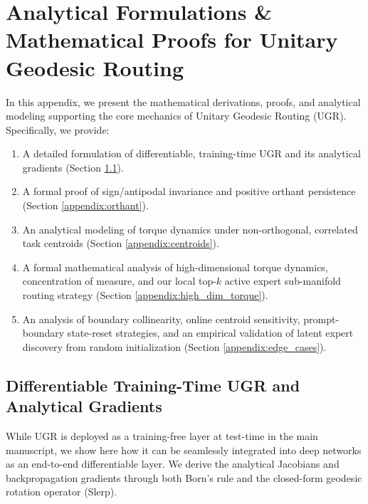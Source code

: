 \documentclass{article}
\theoremstyle{plain}
\theoremstyle{definition}
\theoremstyle{remark}
\begin{document}










\newpage
\appendix
\onecolumn
\section{Analytical Formulations \& Mathematical Proofs for Unitary Geodesic Routing}
\label{appendix:formulations}

In this appendix, we present the mathematical derivations, proofs, and analytical modeling supporting the core mechanics of Unitary Geodesic Routing (UGR). Specifically, we provide:
\begin{enumerate}
    \item A detailed formulation of differentiable, training-time UGR and its analytical gradients (Section \ref{appendix:gradients}).
    \item A formal proof of sign/antipodal invariance and positive orthant persistence (Section \ref{appendix:orthant}).
    \item An analytical modeling of torque dynamics under non-orthogonal, correlated task centroids (Section \ref{appendix:centroids}).
    \item A formal mathematical analysis of high-dimensional torque dynamics, concentration of measure, and our local top-$k$ active expert sub-manifold routing strategy (Section \ref{appendix:high_dim_torque}).
    \item An analysis of boundary collinearity, online centroid sensitivity, prompt-boundary state-reset strategies, and an empirical validation of latent expert discovery from random initialization (Section \ref{appendix:edge_cases}).
\end{enumerate}

\subsection{Differentiable Training-Time UGR and Analytical Gradients}
\label{appendix:gradients}
While UGR is deployed as a training-free layer at test-time in the main manuscript, we show here how it can be seamlessly integrated into deep networks as an end-to-end differentiable layer. We derive the analytical Jacobians and backpropagation gradients through both Born's rule and the closed-form geodesic rotation operator (Slerp).
\end{document}
